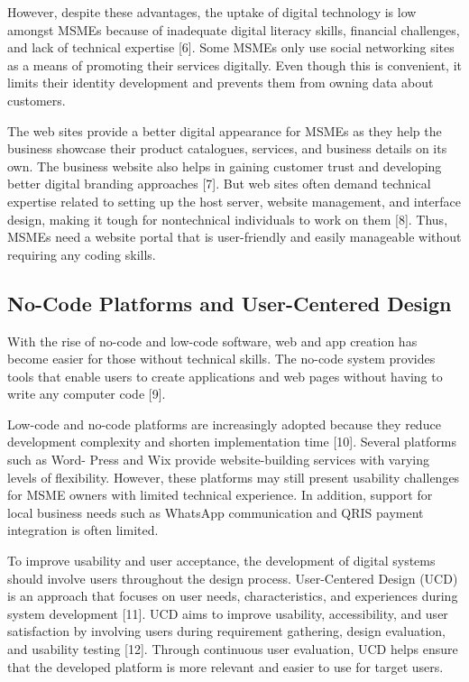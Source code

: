 \documentclass[conference]{IEEEtran}
\begin{document}
However, despite these advantages, the uptake of digital technology is low amongst MSMEs because of inadequate digital literacy skills, financial challenges, and lack of technical expertise [6]. Some MSMEs only use social networking sites as a means of promoting their services digitally. Even though this is convenient, it limits their identity development and prevents them from owning data about customers.

The web sites provide a better digital appearance for MSMEs as they help the business showcase their product catalogues, services, and business details on its own. The business website also helps in gaining customer trust and developing better digital branding approaches [7]. But web sites often demand technical expertise related to setting up the host server, website management, and interface design, making it tough for nontechnical individuals to work on them [8]. Thus, MSMEs need a website portal that is user-friendly and easily manageable without requiring any coding skills.

\subsection{No-Code Platforms and User-Centered Design}
With the rise of no-code and low-code software, web and app creation has become easier for those without technical skills. The no-code system provides tools that enable users to create applications and web pages without having to write any computer code [9].

Low-code and no-code platforms are increasingly adopted because they reduce development complexity and shorten implementation time [10]. Several platforms such as Word- Press and Wix provide website-building services with varying levels of flexibility. However, these platforms may still present usability challenges for MSME owners with limited technical experience. In addition, support for local business needs such as WhatsApp communication and QRIS payment integration is often limited.

To improve usability and user acceptance, the development of digital systems should involve users throughout the design process. User-Centered Design (UCD) is an approach that focuses on user needs, characteristics, and experiences during system development [11]. UCD aims to improve usability, accessibility, and user satisfaction by involving users during requirement gathering, design evaluation, and usability testing [12]. Through continuous user evaluation, UCD helps ensure that the developed platform is more relevant and easier to use for target users.
\end{document}
